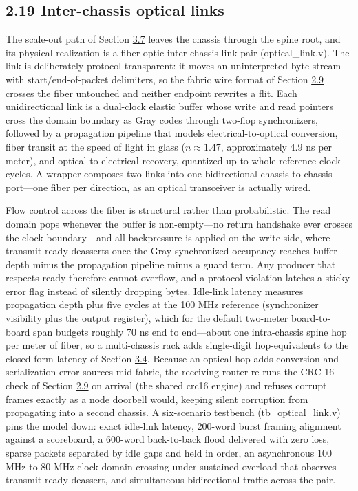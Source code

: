 \documentclass[10pt,twocolumn]{article}
\begin{document}
\subsection*{2.19 Inter-chassis optical links}\label{sec:2.19}

The scale-out path of Section \hyperref[sec:3.7]{3.7} leaves the chassis through the spine root, and its physical realization is a fiber-optic inter-chassis link pair (optical\_link.v). The link is deliberately protocol-transparent: it moves an uninterpreted byte stream with start/end-of-packet delimiters, so the fabric wire format of Section \hyperref[sec:2.9]{2.9} crosses the fiber untouched and neither endpoint rewrites a flit. Each unidirectional link is a dual-clock elastic buffer whose write and read pointers cross the domain boundary as Gray codes through two-flop synchronizers, followed by a propagation pipeline that models electrical-to-optical conversion, fiber transit at the speed of light in glass ($n \approx 1.47$, approximately 4.9 ns per meter), and optical-to-electrical recovery, quantized up to whole reference-clock cycles. A wrapper composes two links into one bidirectional chassis-to-chassis port---one fiber per direction, as an optical transceiver is actually wired.

Flow control across the fiber is structural rather than probabilistic. The read domain pops whenever the buffer is non-empty---no return handshake ever crosses the clock boundary---and all backpressure is applied on the write side, where transmit ready deasserts once the Gray-synchronized occupancy reaches buffer depth minus the propagation pipeline minus a guard term. Any producer that respects ready therefore cannot overflow, and a protocol violation latches a sticky error flag instead of silently dropping bytes. Idle-link latency measures propagation depth plus five cycles at the 100 MHz reference (synchronizer visibility plus the output register), which for the default two-meter board-to-board span budgets roughly 70 ns end to end---about one intra-chassis spine hop per meter of fiber, so a multi-chassis rack adds single-digit hop-equivalents to the closed-form latency of Section \hyperref[sec:3.4]{3.4}. Because an optical hop adds conversion and serialization error sources mid-fabric, the receiving router re-runs the CRC-16 check of Section \hyperref[sec:2.9]{2.9} on arrival (the shared crc16 engine) and refuses corrupt frames exactly as a node doorbell would, keeping silent corruption from propagating into a second chassis. A six-scenario testbench (tb\_optical\_link.v) pins the model down: exact idle-link latency, 200-word burst framing alignment against a scoreboard, a 600-word back-to-back flood delivered with zero loss, sparse packets separated by idle gaps and held in order, an asynchronous 100 MHz-to-80 MHz clock-domain crossing under sustained overload that observes transmit ready deassert, and simultaneous bidirectional traffic across the pair.
\end{document}
